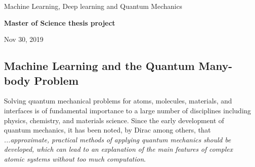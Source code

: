 \documentclass[%
oneside,                 %
final,                   %
10pt]{article}
\begin{document}

\newcommand{\exercisesection}[1]{\subsection*{#1}}






\thispagestyle{empty}

\begin{center}
{\LARGE\bf
\begin{spacing}{1.25}
Machine Learning, Deep learning and Quantum Mechanics
\end{spacing}
}
\end{center}


\begin{center}
{\bf Master of Science thesis project${}^{}$} \\ [0mm]
\end{center}

\begin{center}
\end{center}
    

\begin{center}
Nov 30, 2019
\end{center}

\vspace{1cm}


\subsection{Machine Learning and the Quantum Many-body Problem}

Solving quantum mechanical problems for atoms,  molecules, materials, and
interfaces is of fundamental importance to a large number of
disciplines including physics, chemistry, and materials science. Since
the early development of quantum mechanics, it has been noted, by
Dirac among others, that \emph{...approximate, practical methods of applying quantum mechanics should be developed, which can lead to an explanation of the main features of complex atomic systems without too much computation}. 
\end{document}
